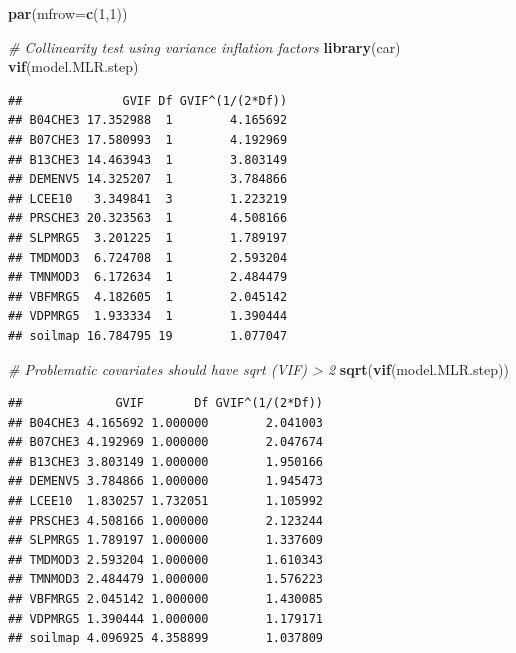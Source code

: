 \documentclass[10pt,b5paper,]{book}
\newenvironment{Shaded}{\begin{snugshade}}{\end{snugshade}}
\newcommand{\CommentTok}[1]{\textcolor[rgb]{0.56,0.35,0.01}{\textit{#1}}}
\newcommand{\DataTypeTok}[1]{\textcolor[rgb]{0.13,0.29,0.53}{#1}}
\newcommand{\DecValTok}[1]{\textcolor[rgb]{0.00,0.00,0.81}{#1}}
\newcommand{\KeywordTok}[1]{\textcolor[rgb]{0.13,0.29,0.53}{\textbf{#1}}}
\newcommand{\NormalTok}[1]{#1}
\theoremstyle{definition}
\theoremstyle{definition}
\theoremstyle{definition}
\theoremstyle{remark}
\begin{document}
\begin{Shaded}
\begin{Highlighting}[]
\KeywordTok{par}\NormalTok{(}\DataTypeTok{mfrow=}\KeywordTok{c}\NormalTok{(}\DecValTok{1}\NormalTok{,}\DecValTok{1}\NormalTok{))}
\end{Highlighting}
\end{Shaded}

 

\begin{Shaded}
\begin{Highlighting}[]
\CommentTok{# Collinearity test using variance inflation factors}
\KeywordTok{library}\NormalTok{(car)}
\KeywordTok{vif}\NormalTok{(model.MLR.step)}
\end{Highlighting}
\end{Shaded}

\begin{verbatim}
##              GVIF Df GVIF^(1/(2*Df))
## B04CHE3 17.352988  1        4.165692
## B07CHE3 17.580993  1        4.192969
## B13CHE3 14.463943  1        3.803149
## DEMENV5 14.325207  1        3.784866
## LCEE10   3.349841  3        1.223219
## PRSCHE3 20.323563  1        4.508166
## SLPMRG5  3.201225  1        1.789197
## TMDMOD3  6.724708  1        2.593204
## TMNMOD3  6.172634  1        2.484479
## VBFMRG5  4.182605  1        2.045142
## VDPMRG5  1.933334  1        1.390444
## soilmap 16.784795 19        1.077047
\end{verbatim}

\begin{Shaded}
\begin{Highlighting}[]
\CommentTok{# Problematic covariates should have sqrt (VIF) > 2}
\KeywordTok{sqrt}\NormalTok{(}\KeywordTok{vif}\NormalTok{(model.MLR.step))}
\end{Highlighting}
\end{Shaded}

\begin{verbatim}
##             GVIF       Df GVIF^(1/(2*Df))
## B04CHE3 4.165692 1.000000        2.041003
## B07CHE3 4.192969 1.000000        2.047674
## B13CHE3 3.803149 1.000000        1.950166
## DEMENV5 3.784866 1.000000        1.945473
## LCEE10  1.830257 1.732051        1.105992
## PRSCHE3 4.508166 1.000000        2.123244
## SLPMRG5 1.789197 1.000000        1.337609
## TMDMOD3 2.593204 1.000000        1.610343
## TMNMOD3 2.484479 1.000000        1.576223
## VBFMRG5 2.045142 1.000000        1.430085
## VDPMRG5 1.390444 1.000000        1.179171
## soilmap 4.096925 4.358899        1.037809
\end{verbatim}
\end{document}
